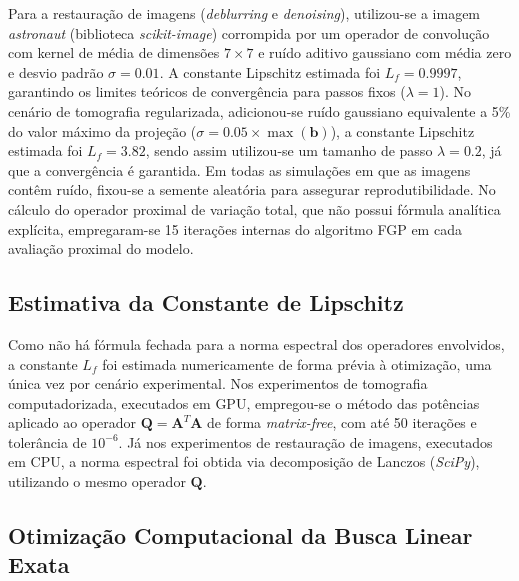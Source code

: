 \documentclass[12pt]{article}
\begin{document}
Para a restauração de imagens (\textit{deblurring} e \textit{denoising}), utilizou-se a imagem \textit{astronaut} (biblioteca \textit{scikit-image}) corrompida por um operador de convolução com kernel de média de dimensões $7 \times 7$ e ruído aditivo gaussiano com média zero e desvio padrão $\sigma = 0.01$. A constante Lipschitz estimada foi $L_f = 0.9997$, garantindo os limites teóricos de convergência para passos fixos ($\lambda = 1$). No cenário de tomografia regularizada, adicionou-se ruído gaussiano equivalente a 5\% do valor máximo da projeção ($\sigma = 0.05 \times \max(\mathbf{b})$), a constante Lipschitz estimada foi $L_f = 3.82$, sendo assim utilizou-se um tamanho de passo $\lambda = 0.2$, já que a convergência é garantida. Em todas as simulações em que as imagens contêm ruído, fixou-se a semente aleatória para assegurar reprodutibilidade. No cálculo do operador proximal de variação total, que não possui fórmula analítica explícita, empregaram-se 15 iterações internas do algoritmo FGP em cada avaliação proximal do modelo.

\subsection{Estimativa da Constante de Lipschitz}

Como não há fórmula fechada para a norma espectral dos operadores envolvidos, a 
constante $L_f$ foi estimada numericamente de forma prévia à otimização, uma única 
vez por cenário experimental. Nos experimentos de tomografia computadorizada, 
executados em GPU, empregou-se o método das potências aplicado ao operador 
$\mathbf{Q}=\mathbf{A}^T\mathbf{A}$ de forma \textit{matrix-free}, com até 50 
iterações e tolerância de $10^{-6}$. Já nos experimentos de restauração de imagens, 
executados em CPU, a norma espectral foi obtida via decomposição de Lanczos 
(\textit{SciPy}), utilizando o mesmo operador $\mathbf{Q}$.

\subsection{Otimização Computacional da Busca Linear Exata}
\end{document}
